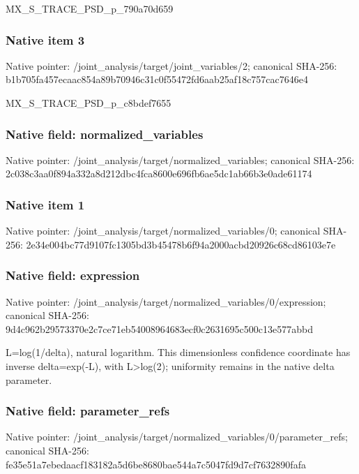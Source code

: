 \documentclass[10pt,a4paper]{article}
\begin{document}
\begingroup\raggedright\sloppy MX\_\allowbreak{}S\_\allowbreak{}TRACE\_\allowbreak{}PSD\_\allowbreak{}p\_\allowbreak{}790a70d659\par\endgroup

\subsubsection{Native item 3}
Native pointer: /joint\_\allowbreak{}analysis/target/joint\_\allowbreak{}variables/2; canonical SHA-256: b1b705fa457ecaac854a89b70946c31c0f55472fd6aab25af18c757cac7646e4

\begingroup\raggedright\sloppy MX\_\allowbreak{}S\_\allowbreak{}TRACE\_\allowbreak{}PSD\_\allowbreak{}p\_\allowbreak{}c8bdef7655\par\endgroup

\subsubsection{Native field: normalized\_\allowbreak{}variables}
Native pointer: /joint\_\allowbreak{}analysis/target/normalized\_\allowbreak{}variables; canonical SHA-256: 2c038c3aa0f894a332a8d212dbc4fca8600e696fb6ae5dc1ab66b3e0ade61174

\subsubsection{Native item 1}
Native pointer: /joint\_\allowbreak{}analysis/target/normalized\_\allowbreak{}variables/0; canonical SHA-256: 2e34e004bc77d9107fc1305bd3b45478b6f94a2000acbd20926c68cd86103e7e

\subsubsection{Native field: expression}
Native pointer: /joint\_\allowbreak{}analysis/target/normalized\_\allowbreak{}variables/0/expression; canonical SHA-256: 9d4c962b29573370e2c7ce71eb54008964683ecf0c2631695c500c13e577abbd

\begingroup\raggedright\sloppy L=\allowbreak{}log(1/\allowbreak{}delta),\allowbreak{} natural logarithm. This dimensionless confidence coordinate has inverse delta=\allowbreak{}exp(-L),\allowbreak{} with L>log(2);\allowbreak{} uniformity remains in the native delta parameter.\par\endgroup

\subsubsection{Native field: parameter\_\allowbreak{}refs}
Native pointer: /joint\_\allowbreak{}analysis/target/normalized\_\allowbreak{}variables/0/parameter\_\allowbreak{}refs; canonical SHA-256: fe35e51a7ebedaacf183182a5d6be8680bae544a7c5047fd9d7cf7632890fafa
\end{document}
